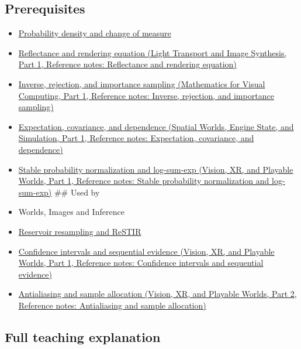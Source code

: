 \subsection{Prerequisites}\label{appendix-031e02bf28af-prerequisites}

\hypertarget{appendix-031e02bf28af-prerequisites}{}

\begin{itemize}
\item
  \hyperref[appendix-4815cd87ab8b]{Probability density and change of measure}
\item
  \href{../04-Light-Transport-and-Image-Synthesis-P01/main.pdf\#nameddest=appendix-96da0b153b77}{Reflectance and rendering equation (Light Transport and Image Synthesis, Part 1, Reference notes: Reflectance and rendering equation)}
\item
  \href{../02-Mathematics-for-Visual-Computing-P01/main.pdf\#nameddest=appendix-8d863ed954d0}{Inverse, rejection, and importance sampling (Mathematics for Visual Computing, Part 1, Reference notes: Inverse, rejection, and importance sampling)}
\item
  \href{../05-Spatial-Worlds-Engine-State-and-Simulation-P01/main.pdf\#nameddest=appendix-54c383df9992}{Expectation, covariance, and dependence (Spatial Worlds, Engine State, and Simulation, Part 1, Reference notes: Expectation, covariance, and dependence)}
\item
  \href{../07-Vision-XR-and-Playable-Worlds-P01/main.pdf\#nameddest=appendix-d580b422240f}{Stable probability normalization and log-sum-exp (Vision, XR, and Playable Worlds, Part 1, Reference notes: Stable probability normalization and log-sum-exp)} \#\# Used by
\item
  {Worlds, Images and Inference}
\item
  \hyperref[appendix-68be451b78b1]{Reservoir resampling and ReSTIR}
\item
  \href{../07-Vision-XR-and-Playable-Worlds-P01/main.pdf\#nameddest=appendix-c83016554b1e}{Confidence intervals and sequential evidence (Vision, XR, and Playable Worlds, Part 1, Reference notes: Confidence intervals and sequential evidence)}
\item
  \href{../07-Vision-XR-and-Playable-Worlds-P02/main.pdf\#nameddest=appendix-4192b2bdd21e}{Antialiasing and sample allocation (Vision, XR, and Playable Worlds, Part 2, Reference notes: Antialiasing and sample allocation)}
\end{itemize}

\subsection{Full teaching explanation}\label{appendix-031e02bf28af-full-teaching-explanation}

